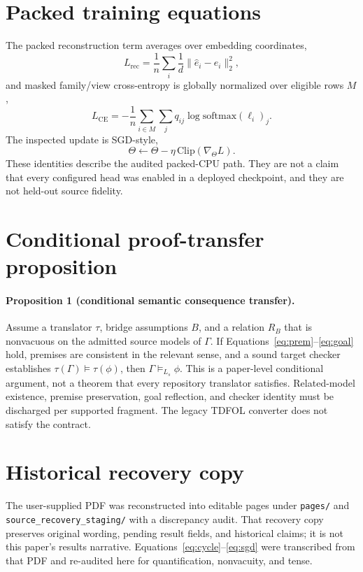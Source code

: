 \documentclass{article}
\begin{document}
\section{Packed training equations}
\label{app:packed}
The packed reconstruction term averages over embedding coordinates,
\begin{equation}
L_{\mathrm{rec}}=\frac1n\sum_i\frac1d\|\hat e_i-e_i\|_2^2,
\label{eq:rec}
\end{equation}
and masked family/view cross-entropy is globally normalized over eligible rows $M$,
\begin{equation}
L_{\mathrm{CE}}=-\frac1n\sum_{i\in M}\sum_j q_{ij}\log\mathrm{softmax}(\ell_i)_j.
\label{eq:ce}
\end{equation}
The inspected update is SGD-style,
\begin{equation}
\Theta\leftarrow\Theta-\eta\,\mathrm{Clip}(\nabla_\Theta L).
\label{eq:sgd}
\end{equation}
These identities describe the audited packed-CPU path. They are not a claim that every configured head was enabled in a deployed checkpoint, and they are not held-out source fidelity.

\section{Conditional proof-transfer proposition}
\label{app:prop}
\paragraph{Proposition 1 (conditional semantic consequence transfer).}
\label{prop:transfer}
Assume a translator $\tau$, bridge assumptions $B$, and a relation $R_B$ that is nonvacuous on the admitted source models of $\Gamma$. If Equations~\ref{eq:prem}--\ref{eq:goal} hold, premises are consistent in the relevant sense, and a sound target checker establishes $\tau(\Gamma)\models\tau(\phi)$, then $\Gamma\models_{L_s}\phi$.
This is a paper-level conditional argument, not a theorem that every repository translator satisfies. Related-model existence, premise preservation, goal reflection, and checker identity must be discharged per supported fragment. The legacy TDFOL converter does not satisfy the contract.

\section{Historical recovery copy}
\label{app:recovery}
The user-supplied PDF was reconstructed into editable pages under \texttt{pages/} and \texttt{source\_recovery\_staging/} with a discrepancy audit. That recovery copy preserves original wording, pending result fields, and historical claims; it is not this paper's results narrative. Equations~\ref{eq:cycle}--\ref{eq:sgd} were transcribed from that PDF and re-audited here for quantification, nonvacuity, and tense.
\end{document}
